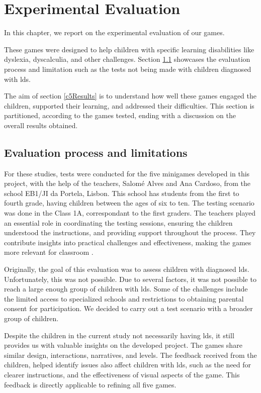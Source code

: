 \chapter{Experimental Evaluation}
\label{cha:results}

In this chapter, we report on the experimental evaluation of our games.

These games were designed to help children with specific learning disabilities like dyslexia, dyscalculia, and other challenges. Section \ref{c5TestProcess} showcases the evaluation process and limitation such as the tests not being made with children diagnosed with \glspl{ld}.

The aim of section \ref{c5Results} is to understand how well these games engaged the children, supported their learning, and addressed their difficulties. This section is partitioned, according to the games tested, ending with a discussion on the overall results obtained.


\newpage

\section{Evaluation process and limitations}
\label{c5TestProcess}

For these studies, tests were conducted for the five minigames developed in this project, with the help of the teachers, Salomé Alves and Ana Cardoso, from the school EB1/JI da Portela, Lisbon. This school has students from the first to fourth grade, having children between the ages of six to ten.
The testing scenario was done in the Class 1A, correspondant to the first graders.
The teachers played an essential role in coordinating the testing sessions, ensuring the children understood the instructions, and providing support throughout the process. They contribute insights into practical challenges and effectiveness, making the games more relevant for classroom \cite{challengingKT}.

Originally, the goal of this evaluation was to assess children with diagnosed \glspl{ld}. Unfortunately, this was not possible. Due to several factors, it was not possible to reach a large enough group of children with \glspl{ld}. Some of the challenges include the limited access to specialized schools and restrictions to obtaining parental consent for participation. We decided to carry out a test scenario with a broader group of children.

Despite the children in the current study not necessarily having \glspl{ld}, it still provides us with valuable insights on the developed project. The games share similar design, interactions, narratives, and levels. The feedback received from the children, helped identify issues also affect children with \glspl{ld}, such as the need for clearer instructions, and the effectiveness of visual aspects of the game. This feedback is directly applicable to refining all five games.

